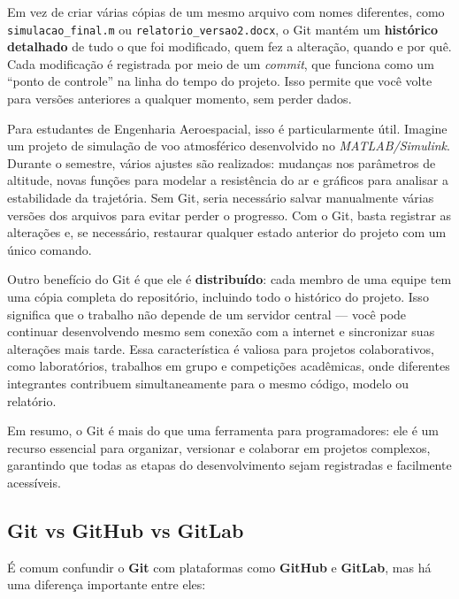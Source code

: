 Em vez de criar várias cópias de um mesmo arquivo com nomes diferentes, como \texttt{simulacao\_final.m} ou \texttt{relatorio\_versao2.docx}, o Git mantém um \textbf{histórico detalhado} de tudo o que foi modificado, quem fez a alteração, quando e por quê. Cada modificação é registrada por meio de um \textit{commit}, que funciona como um “ponto de controle” na linha do tempo do projeto. Isso permite que você volte para versões anteriores a qualquer momento, sem perder dados.

Para estudantes de Engenharia Aeroespacial, isso é particularmente útil. Imagine um projeto de simulação de voo atmosférico desenvolvido no \textit{MATLAB/Simulink}. Durante o semestre, vários ajustes são realizados: mudanças nos parâmetros de altitude, novas funções para modelar a resistência do ar e gráficos para analisar a estabilidade da trajetória. Sem Git, seria necessário salvar manualmente várias versões dos arquivos para evitar perder o progresso. Com o Git, basta registrar as alterações e, se necessário, restaurar qualquer estado anterior do projeto com um único comando.

Outro benefício do Git é que ele é \textbf{distribuído}: cada membro de uma equipe tem uma cópia completa do repositório, incluindo todo o histórico do projeto. Isso significa que o trabalho não depende de um servidor central — você pode continuar desenvolvendo mesmo sem conexão com a internet e sincronizar suas alterações mais tarde. Essa característica é valiosa para projetos colaborativos, como laboratórios, trabalhos em grupo e competições acadêmicas, onde diferentes integrantes contribuem simultaneamente para o mesmo código, modelo ou relatório.

Em resumo, o Git é mais do que uma ferramenta para programadores: ele é um recurso essencial para organizar, versionar e colaborar em projetos complexos, garantindo que todas as etapas do desenvolvimento sejam registradas e facilmente acessíveis.

\subsection{Git vs GitHub vs GitLab}

É comum confundir o \textbf{Git} com plataformas como \textbf{GitHub} e \textbf{GitLab}, mas há uma diferença importante entre eles:


